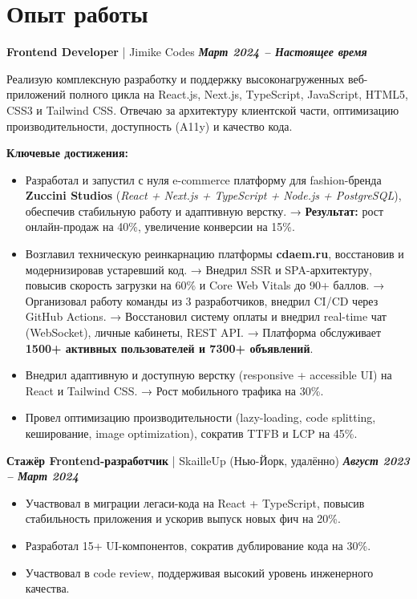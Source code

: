 \documentclass[a4paper,11pt]{article}
\newcommand{\entry}[3]{%
  \noindent\textbf{#1} | #2 \hfill \textbf{\textit{#3}} \par
}
\begin{document}
\section*{Опыт работы}

\entry{Frontend Developer}{Jimike Codes}{Март 2024 – Настоящее время}
Реализую комплексную разработку и поддержку высоконагруженных веб-приложений полного цикла на React.js, Next.js, TypeScript, JavaScript, HTML5, CSS3 и Tailwind CSS. Отвечаю за архитектуру клиентской части, оптимизацию производительности, доступность (A11y) и качество кода.

\textbf{Ключевые достижения:}
\begin{itemize}[leftmargin=*, topsep=0.5ex, itemsep=0.2ex]
    \item Разработал и запустил с нуля e-commerce платформу для fashion-бренда \textbf{Zuccini Studios} (\textit{React + Next.js + TypeScript + Node.js + PostgreSQL}), обеспечив стабильную работу и адаптивную верстку.  
    → \textbf{Результат:} рост онлайн-продаж на 40\%, увеличение конверсии на 15\%.
    \item Возглавил техническую реинкарнацию платформы \textbf{cdaem.ru}, восстановив и модернизировав устаревший код.  
    → Внедрил SSR и SPA-архитектуру, повысив скорость загрузки на 60\% и Core Web Vitals до 90+ баллов.  
    → Организовал работу команды из 3 разработчиков, внедрил CI/CD через GitHub Actions.  
    → Восстановил систему оплаты и внедрил real-time чат (WebSocket), личные кабинеты, REST API.  
    → Платформа обслуживает \textbf{1500+ активных пользователей и 7300+ объявлений}.
    \item Внедрил адаптивную и доступную верстку (responsive + accessible UI) на React и Tailwind CSS.  
    → Рост мобильного трафика на 30\%.
    \item Провел оптимизацию производительности (lazy-loading, code splitting, кеширование, image optimization), сократив TTFB и LCP на 45\%.
\end{itemize}
\vspace{1ex}

\entry{Стажёр Frontend-разработчик}{SkailleUp (Нью-Йорк, удалённо)}{Август 2023 – Март 2024}
\begin{itemize}[leftmargin=*, topsep=0.5ex, itemsep=0.2ex]
    \item Участвовал в миграции легаси-кода на React + TypeScript, повысив стабильность приложения и ускорив выпуск новых фич на 20\%.
    \item Разработал 15+ UI-компонентов, сократив дублирование кода на 30\%.
    \item Участвовал в code review, поддерживая высокий уровень инженерного качества.
\end{itemize}
\vspace{1ex}
\end{document}
